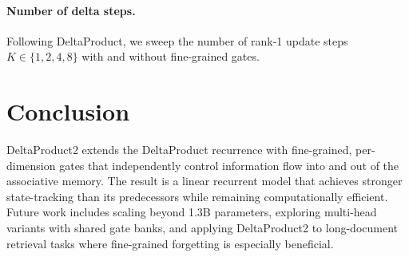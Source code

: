 \documentclass[11pt]{article}
\begin{document}
\paragraph{Number of delta steps.}
Following DeltaProduct, we sweep the number of rank-1 update steps
$K \in \{1, 2, 4, 8\}$ with and without fine-grained gates.

\section{Conclusion}

DeltaProduct2 extends the DeltaProduct recurrence with fine-grained,
per-dimension gates that independently control information flow into and
out of the associative memory.
The result is a linear recurrent model that achieves stronger
state-tracking than its predecessors while remaining computationally
efficient.
Future work includes scaling beyond 1.3B parameters, exploring
multi-head variants with shared gate banks, and applying DeltaProduct2
to long-document retrieval tasks where fine-grained forgetting is
especially beneficial.



\end{document}

